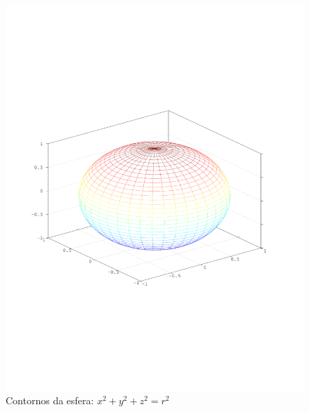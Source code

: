 \begin{figure}[!h]
	\centering
	\caption{Contornos da esfera: $x^2 + y^2 + z^2 = r^2$}
	\includegraphics[scale=0.8]{quadricas/esfera-contornos.pdf}
\end{figure}

